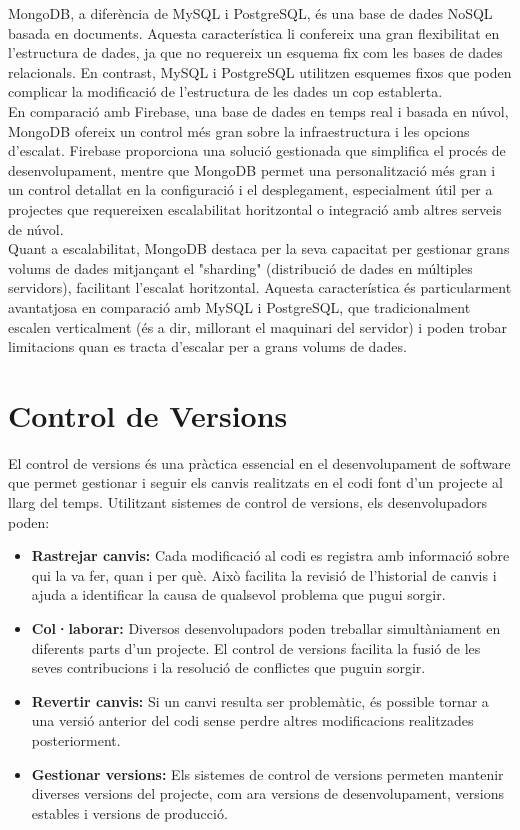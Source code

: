 \documentclass[a4paper,12pt,twoside]{ThesisStyle}
\begin{document}
MongoDB, a diferència de MySQL i PostgreSQL, és una base de dades NoSQL basada en documents. Aquesta característica li confereix una gran flexibilitat en l'estructura de dades, ja que no requereix un esquema fix com les bases de dades relacionals. En contrast, MySQL i PostgreSQL utilitzen esquemes fixos que poden complicar la modificació de l'estructura de les dades un cop establerta.\\

En comparació amb Firebase, una base de dades en temps real i basada en núvol, MongoDB ofereix un control més gran sobre la infraestructura i les opcions d'escalat. Firebase proporciona una solució gestionada que simplifica el procés de desenvolupament, mentre que MongoDB permet una personalització més gran i un control detallat en la configuració i el desplegament, especialment útil per a projectes que requereixen escalabilitat horitzontal o integració amb altres serveis de núvol.\\

Quant a escalabilitat, MongoDB destaca per la seva capacitat per gestionar grans volums de dades mitjançant el "sharding" (distribució de dades en múltiples servidors), facilitant l'escalat horitzontal. Aquesta característica és particularment avantatjosa en comparació amb MySQL i PostgreSQL, que tradicionalment escalen verticalment (és a dir, millorant el maquinari del servidor) i poden trobar limitacions quan es tracta d'escalar per a grans volums de dades.


\section{Control de Versions}

El control de versions és una pràctica essencial en el desenvolupament de software que permet gestionar i seguir els canvis realitzats en el codi font d'un projecte al llarg del temps. Utilitzant sistemes de control de versions, els desenvolupadors poden:

\begin{itemize}
    \item \textbf{Rastrejar canvis:} Cada modificació al codi es registra amb informació sobre qui la va fer, quan i per què. Això facilita la revisió de l'historial de canvis i ajuda a identificar la causa de qualsevol problema que pugui sorgir.
    \item \textbf{Col·laborar:} Diversos desenvolupadors poden treballar simultàniament en diferents parts d'un projecte. El control de versions facilita la fusió de les seves contribucions i la resolució de conflictes que puguin sorgir.
    \item \textbf{Revertir canvis:} Si un canvi resulta ser problemàtic, és possible tornar a una versió anterior del codi sense perdre altres modificacions realitzades posteriorment.
    \item \textbf{Gestionar versions:} Els sistemes de control de versions permeten mantenir diverses versions del projecte, com ara versions de desenvolupament, versions estables i versions de producció.
\end{itemize}
\end{document}
